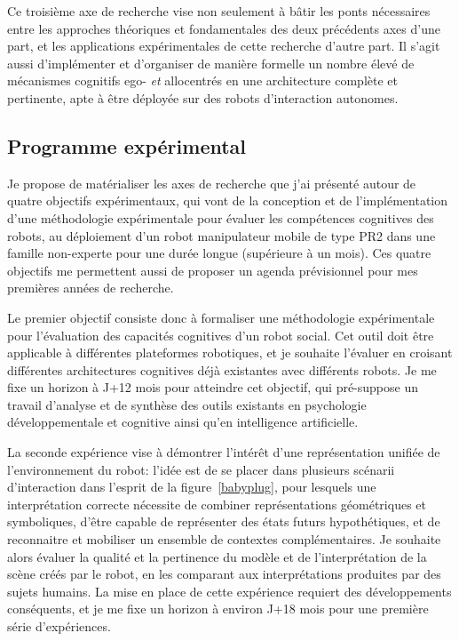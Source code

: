 \documentclass[a4paper]{article}
\begin{document}
Ce troisième axe de recherche vise non seulement à bâtir les ponts nécessaires
entre les approches théoriques et fondamentales des deux précédents axes d'une
part, et les applications expérimentales de cette recherche d'autre part. Il
s'agit aussi d'implémenter et d'organiser de manière formelle un nombre élevé de
mécanismes cognitifs ego- \emph{et} allocentrés en une architecture complète et pertinente, apte à être
déployée sur des robots d'interaction autonomes.

\subsection*{Programme expérimental}

Je propose de matérialiser les axes de recherche que j'ai présenté autour de
quatre objectifs expérimentaux, qui vont de la conception et de
l'implémentation d'une méthodologie expérimentale pour évaluer les compétences
cognitives des robots, au déploiement d'un robot manipulateur mobile de type
PR2 dans une famille non-experte pour une durée longue (supérieure à un mois).
Ces quatre objectifs me permettent aussi de proposer un agenda prévisionnel
pour mes premières années de recherche.

Le premier objectif consiste donc à formaliser une méthodologie expérimentale
pour l'évaluation des capacités cognitives d'un robot social. Cet outil doit
être applicable à différentes plateformes robotiques, et je souhaite l'évaluer
en croisant différentes architectures cognitives déjà existantes avec différents
robots.  Je me fixe un horizon à J+12 mois pour atteindre cet objectif, qui
pré-suppose un travail d'analyse et de synthèse des outils existants en
psychologie développementale et cognitive ainsi qu'en intelligence
artificielle.

La seconde expérience vise à démontrer l'intérêt d'une représentation unifiée de
l'environnement du robot: l'idée est de se placer dans plusieurs scénarii
d'interaction dans l'esprit de la figure~\ref{babyplug}, pour lesquels une
interprétation correcte nécessite de combiner représentations géométriques et
symboliques, d'être capable de représenter des états futurs hypothétiques, et de
reconnaitre et mobiliser un ensemble de contextes complémentaires. Je souhaite
alors évaluer la qualité et la pertinence du modèle et de l'interprétation de la
scène créés par le robot, en les comparant aux interprétations produites par des
sujets humains. La mise en place de cette expérience requiert des développements
conséquents, et je me fixe un horizon à environ J+18 mois pour une première
série d'expériences.
\end{document}
